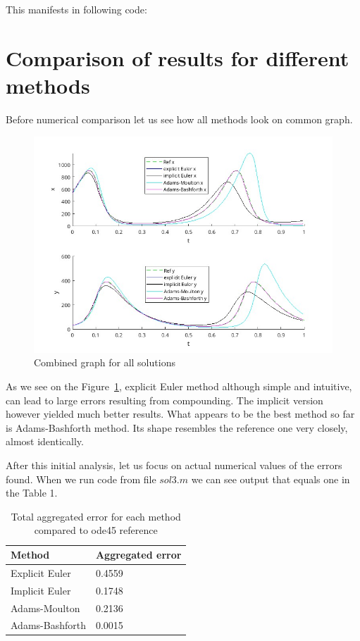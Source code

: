 \documentclass[11pt]{article}
\begin{document}
This manifests in following code:


\section{Comparison of results for different methods}
Before numerical comparison let us see how all methods look on common graph.

\begin{figure}[ht!]
    \includegraphics[width=\textwidth]{combined.jpg}
    \caption{Combined graph for all solutions}
    \label{fig:combined_methods}
\end{figure}

As we see on the Figure~\ref{fig:combined_methods}, 
explicit Euler method although simple and intuitive, can lead to
large errors resulting from compounding. 
The implicit version however yielded much better results. What appears to be
the best method so far is Adams-Bashforth method. Its shape resembles the
reference one very closely, almost identically.

After this initial analysis, let us focus on actual numerical values of the errors found.
When we run code from file $sol3.m$ we can see output that equals one in the Table 1.

\begin{table}[H]
    \caption{Total aggregated error for each method compared to ode45 reference}
    \label{tab:aggregated_error}
    \begin{center}
        \begin{tabular}{l|l}
            Method & Aggregated error \\
            \hline
            Explicit Euler & 0.4559 \\
            Implicit Euler & 0.1748 \\
            Adams-Moulton & 0.2136 \\
            Adams-Bashforth & 0.0015 \\
        \end{tabular}
    \end{center}
\end{table}
\end{document}
